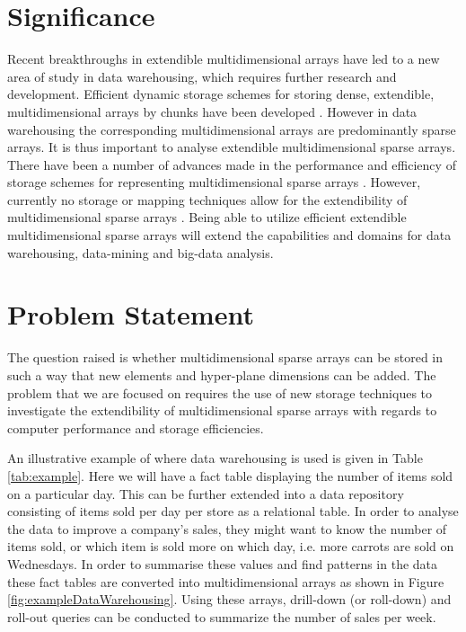 \section{Significance}
Recent breakthroughs in extendible multidimensional arrays have led to a new area of study in data warehousing, which requires further research and development. Efficient dynamic storage schemes for storing dense, extendible, multidimensional arrays by chunks have been developed \cite{nimako:2012:ced,pedereira:2015:cas}. However in data warehousing the corresponding multidimensional arrays are predominantly sparse arrays. It is thus important to analyse extendible multidimensional sparse arrays. There have been a number of advances made in the performance and efficiency of storage schemes for representing multidimensional sparse arrays \cite{otoo:2016:msa,goil:bess,otoo:2014:nas}. However, currently no storage or mapping techniques allow for the extendibility of multidimensional sparse arrays \cite{nimako:2016:cea}. Being able to utilize efficient extendible multidimensional sparse arrays will extend the capabilities and domains for data warehousing, data-mining and big-data analysis.

\section{Problem Statement}
The question raised is whether multidimensional sparse arrays can be stored in such a way that new elements and hyper-plane dimensions can be added. The problem that we are focused on requires the use of new storage techniques to investigate the extendibility of multidimensional sparse arrays with regards to computer performance and storage efficiencies.

An illustrative example of where data warehousing is used is given in Table \ref{tab:example}. Here we will have a fact table displaying the number of items sold on a particular day. This can be further extended into a data repository consisting of items sold per day per store as a relational table. In order to analyse the data to improve a company's sales, they might want to know the number of items sold, or which item is sold more on which day, i.e. more carrots are sold on Wednesdays. In order to summarise these values and find patterns in the data these fact tables are converted into multidimensional arrays as shown in Figure \ref{fig:exampleDataWarehousing}.  Using these arrays, drill-down (or roll-down) and roll-out queries can be conducted to summarize the number of sales per week.

